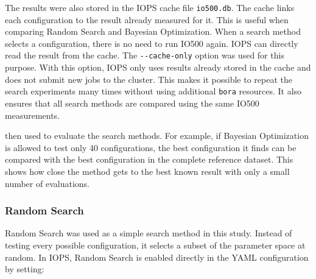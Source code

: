 The results were also stored in the IOPS cache file
\texttt{io500.db}. The cache links each configuration to the result
already measured for it.
This is useful when comparing Random Search and Bayesian Optimization.
When a search method selects a configuration, there is no need to run
IO500 again. IOPS can directly read the result from the cache.
The \texttt{-{}-cache-only} option was used for this purpose. With this
option, IOPS only uses results already stored in the cache and does not
submit new jobs to the cluster.
This makes it possible to repeat the search experiments many times
without using additional \texttt{bora} resources. It also ensures that
all search methods are compared using the same IO500 measurements.


 then used to evaluate the search methods. For example,
if Bayesian Optimization is allowed to test only 40 configurations, the
best configuration it finds can be compared with the best configuration
in the complete reference dataset. This shows how close the method gets
to the best known result with only a small number of evaluations.

    \subsubsection{Random Search}
\label{sec:random-search}

Random Search was used as a simple search method in this study. Instead
of testing every possible configuration, it selects a subset of the
parameter space at random.
In IOPS, Random Search is enabled directly in the YAML configuration by
setting:

